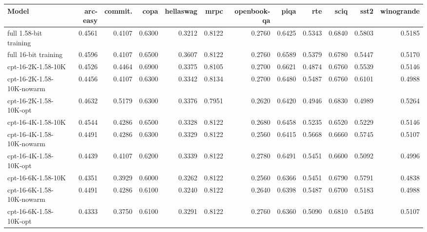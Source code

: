 \begin{tabular}{lrrrrrrrrrrr}
\toprule
Model & arc-easy & commit. & copa & hellaswag & mrpc & openbook-qa & piqa & rte & sciq & sst2 & winogrande \\
\midrule
full 1.58-bit training & 0.4561 & 0.4107 & 0.6300 & 0.3212 & 0.8122 & 0.2760 & 0.6425 & 0.5343 & 0.6840 & 0.5803 & 0.5185 \\
full 16-bit training & 0.4596 & 0.4107 & 0.6500 & 0.3607 & 0.8122 & 0.2760 & 0.6589 & 0.5379 & 0.6780 & 0.5447 & 0.5170 \\
\midrule
cpt-16-2K-1.58-10K & 0.4526 & 0.4464 & 0.6900 & 0.3375 & 0.8105 & 0.2700 & 0.6621 & 0.4874 & 0.6760 & 0.5539 & 0.5146 \\
cpt-16-2K-1.58-10K-nowarm & 0.4456 & 0.4107 & 0.6300 & 0.3342 & 0.8134 & 0.2700 & 0.6480 & 0.5487 & 0.6760 & 0.6101 & 0.4988 \\
cpt-16-2K-1.58-10K-opt & 0.4632 & 0.5179 & 0.6300 & 0.3376 & 0.7951 & 0.2620 & 0.6420 & 0.4946 & 0.6830 & 0.4989 & 0.5264 \\
cpt-16-4K-1.58-10K & 0.4544 & 0.4286 & 0.6500 & 0.3328 & 0.8122 & 0.2680 & 0.6458 & 0.5235 & 0.6520 & 0.5229 & 0.5146 \\
cpt-16-4K-1.58-10K-nowarm & 0.4491 & 0.4286 & 0.6300 & 0.3329 & 0.8122 & 0.2560 & 0.6415 & 0.5668 & 0.6660 & 0.5745 & 0.5107 \\
cpt-16-4K-1.58-10K-opt & 0.4439 & 0.4107 & 0.6200 & 0.3339 & 0.8122 & 0.2780 & 0.6491 & 0.5451 & 0.6600 & 0.5092 & 0.4996 \\
cpt-16-6K-1.58-10K & 0.4351 & 0.3929 & 0.6000 & 0.3262 & 0.8122 & 0.2560 & 0.6366 & 0.5451 & 0.6790 & 0.5791 & 0.4838 \\
cpt-16-6K-1.58-10K-nowarm & 0.4491 & 0.4286 & 0.6100 & 0.3240 & 0.8122 & 0.2640 & 0.6398 & 0.5487 & 0.6700 & 0.5183 & 0.4988 \\
cpt-16-6K-1.58-10K-opt & 0.4333 & 0.3750 & 0.6100 & 0.3291 & 0.8122 & 0.2760 & 0.6360 & 0.5090 & 0.6810 & 0.5493 & 0.5107 \\

\bottomrule
\end{tabular}

